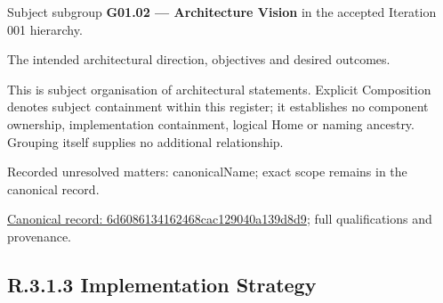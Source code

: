 Subject subgroup \textbf{G01.02 — Architecture Vision} in the accepted Iteration 001 hierarchy.



The intended architectural direction, objectives and desired outcomes.



This is subject organisation of architectural statements. Explicit Composition denotes subject containment within this register; it establishes no component ownership, implementation containment, logical Home or naming ancestry. Grouping itself supplies no additional relationship.


{\small Recorded unresolved matters: canonicalName; exact scope remains in the canonical record.}\par
{\footnotesize \href{../../../../continuum/grouping/6d6086134162468cac129040a139d8d9.md}{Canonical record: 6d6086134162468cac129040a139d8d9}; full qualifications and provenance.}\par
\subsection*{R.3.1.3 Implementation Strategy}
\label{navigation:R.3.1.3}

